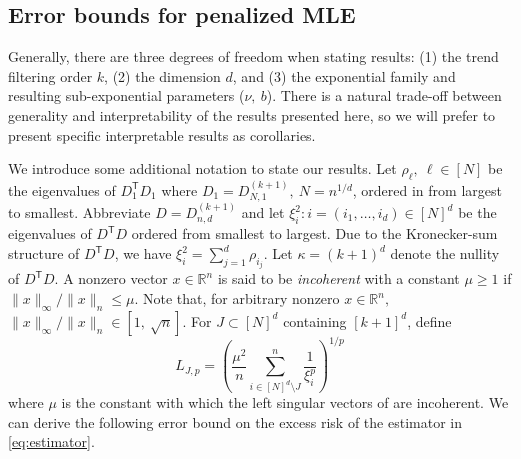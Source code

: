 \documentclass[ejs,noshowframe]{imsart}
\theoremstyle{plain}
\theoremstyle{definition}
\newcommand{\R}{\mathbb{R}}
\renewcommand{\top}{\mathsf{T}}
\begin{document}
\subsection{Error bounds for penalized MLE}
\label{sec:error-bounds-penal}

Generally, there are three degrees of freedom when stating results: (1) the 
trend 
filtering order $k$, (2) the dimension $d$, and (3) the exponential family and  
resulting sub-exponential parameters ($\nu,\ b$).
There is a natural trade-off between generality and interpretability of the 
results presented here, so we will prefer to present specific interpretable 
results as corollaries.


We introduce some additional notation to state our results. Let $\rho_\ell,\
\ell \in [N]$ be the eigenvalues of $D_1^\top D_1$ where $D_1 = D_{N,
1}^{(k+1)},\ N = n^{1/d}$, ordered in from largest to smallest. Abbreviate $D =
D_{n,d}^{(k+1)}$ and let  ${\xi_{i}^2: i = (i_1, \dots, i_d) \in [N]^d}$ be the
eigenvalues of $D^\top D$ ordered from smallest to largest. Due to the
Kronecker-sum structure of $D^\top D$, we have
$
\xi_i^2 = \sum_{j=1}^d \rho_{i_j}.
$
Let $\kappa = (k+1)^d$ denote the nullity of $D^\top D$.
A nonzero vector $x \in \R^n$ is said to be {\em incoherent} with a constant 
$\mu\ge 1$
if $\|x\|_\infty/\|x\|_n \leq \mu.$ Note that, for arbitrary nonzero
$x\in \R^n,$ $\|x\|_\infty/\|x\|_n \in [1,\ \sqrt{n}].$ 
For $J \subset [N]^d$ containing $[k+1]^d$, define
\begin{equation}
	\label{eq:Lell}
	L_{J,p} = \left( \frac{\mu^2}{n} \sum_{i \in [N]^d \setminus J}^n 
	\frac{1}{\xi_{i}^p} \right)^{1/p}
\end{equation}
where $\mu$ is the constant with which the left singular vectors of  
are incoherent.
We can derive the following error bound on the excess risk of the estimator in 
\eqref{eq:estimator}.
\end{document}
